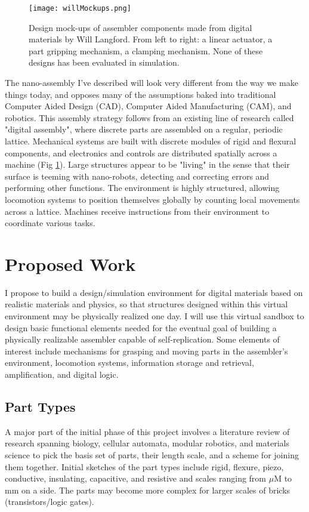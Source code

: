 {\begin{figure}
  \texttt{[image: willMockups.png]}
  \caption{Design mock-ups of assembler components made from digital materials by Will Langford.  From left to right: a linear actuator, a part gripping mechanism, a clamping mechanism.  None of these designs has been evaluated in simulation.}
  \label{fig:willMockups}
\end{figure}
The nano-assembly I've described will look very different from the way we make things today, and opposes many of the assumptions baked into traditional Computer Aided Design (CAD),  Computer Aided Manufacturing (CAM), and robotics.  This assembly strategy follows from an existing line of research called "digital assembly", where discrete parts are assembled on a regular, periodic lattice.  Mechanical systems are built with discrete modules of rigid and flexural components, and electronics and controls are distributed spatially across a machine (Fig \ref{fig:willMockups}).  Large structures appear to be "living" in the sense that their surface is teeming with nano-robots, detecting and correcting errors and performing other functions.  The environment is highly structured, allowing locomotion systems to position themselves globally by counting local movements across a lattice.  Machines receive instructions from their environment to coordinate various tasks.
\\

\section{Proposed Work}

I propose to build a design/simulation environment for digital materials based on realistic materials and physics, so that structures designed within this virtual environment may be physically realized one day.  I will use this virtual sandbox to design basic functional elements needed for the eventual goal of building a physically realizable assembler capable of self-replication.  Some elements of interest include mechanisms for grasping and moving parts in the assembler's environment, locomotion systems, information storage and retrieval, amplification, and digital logic.

\subsection{Part Types}

A major part of the initial phase of this project involves a literature review of research spanning biology, cellular automata, modular robotics, and materials science to pick the basis set of parts, their length scale, and a scheme for joining them together.  Initial sketches of the part types include rigid, flexure, piezo, conductive, insulating, capacitive, and resistive and scales ranging from $\mu$M to mm on a side.  The parts may become more complex for larger scales of bricks (transistors/logic gates).

}
